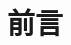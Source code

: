 \documentclass[12pt,a4paper]{article}
\title{}
\author{}
\date{}
\begin{document}
\tableofcontents

\newpage

\section*{前言}
\end{document}
